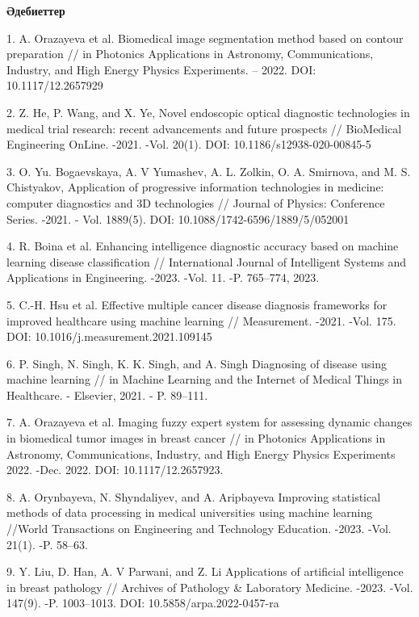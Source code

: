 \begin{center}
{\bfseries Әдебиеттер}
\end{center}

1. A. Orazayeva et al. Biomedical image segmentation method based on
contour preparation // in Photonics Applications in Astronomy,
Communications, Industry, and High Energy Physics Experiments. -- 2022.
DOI: 10.1117/12.2657929

2. Z. He, P. Wang, and X. Ye, Novel endoscopic optical diagnostic
technologies in medical trial research: recent advancements and future
prospects // BioMedical Engineering OnLine. -2021. -Vol. 20(1). DOI:
10.1186/s12938-020-00845-5

3. O. Yu. Bogaevskaya, A. V Yumashev, A. L. Zolkin, O. A. Smirnova, and
M. S. Chistyakov, Application of progressive information technologies in
medicine: computer diagnostics and 3D technologies // Journal of
Physics: Conference Series. -2021. - Vol. 1889(5). DOI:
10.1088/1742-6596/1889/5/052001

4. R. Boina et al. Enhancing intelligence diagnostic accuracy based on
machine learning disease classification // International Journal of
Intelligent Systems and Applications in Engineering. -2023. -Vol. 11.
-P. 765--774, 2023.

5. C.-H. Hsu et al. Effective multiple cancer disease diagnosis
frameworks for improved healthcare using machine learning //
Measurement. -2021. -Vol. 175. DOI: 10.1016/j.measurement.2021.109145

6. P. Singh, N. Singh, K. K. Singh, and A. Singh Diagnosing of disease
using machine learning // in Machine Learning and the Internet of
Medical Things in Healthcare. - Elsevier, 2021. - P. 89--111.

7. A. Orazayeva et al. Imaging fuzzy expert system for assessing dynamic
changes in biomedical tumor images in breast cancer // in Photonics
Applications in Astronomy, Communications, Industry, and High Energy
Physics Experiments 2022. -Dec. 2022. DOI: 10.1117/12.2657923.

8. A. Orynbayeva, N. Shyndaliyev, and A. Aripbayeva Improving
statistical methods of data processing in medical universities using
machine learning //World Transactions on Engineering and Technology
Education. -2023. -Vol. 21(1). -P. 58--63.

9. Y. Liu, D. Han, A. V Parwani, and Z. Li Applications of artificial
intelligence in breast pathology // Archives of Pathology \& Laboratory
Medicine. -2023. -Vol. 147(9). -P. 1003--1013. DOI:
10.5858/arpa.2022-0457-ra

